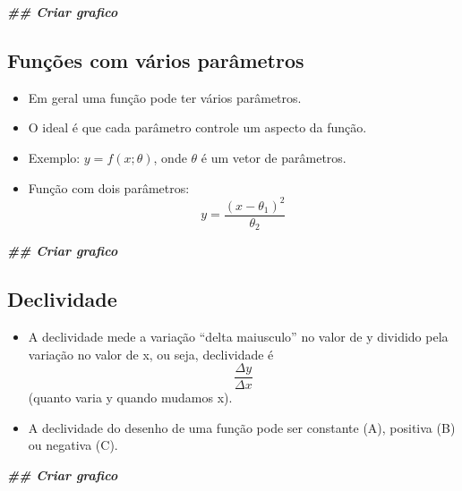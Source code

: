 \documentclass[
]{article}
\newenvironment{Shaded}{\begin{snugshade}}{\end{snugshade}}
\newcommand{\DocumentationTok}[1]{\textcolor[rgb]{0.56,0.35,0.01}{\textbf{\textit{#1}}}}
\providecommand{\tightlist}{%
  \setlength{\itemsep}{0pt}\setlength{\parskip}{0pt}}
\begin{document}
\begin{Shaded}
\begin{Highlighting}[]
\DocumentationTok{\#\# Criar grafico}
\end{Highlighting}
\end{Shaded}

\hypertarget{funuxe7uxf5es-com-vuxe1rios-paruxe2metros}{%
\subsection{Funções com vários
parâmetros}\label{funuxe7uxf5es-com-vuxe1rios-paruxe2metros}}

\begin{itemize}
\tightlist
\item
  Em geral uma função pode ter vários parâmetros.
\item
  O ideal é que cada parâmetro controle um aspecto da função.
\item
  Exemplo: \(y = f(x; \theta)\), onde \(\theta\) é um vetor de
  parâmetros.
\item
  Função com dois parâmetros:
  \[ y = \frac{(x - \theta_{1})^2}{\theta_{2}}\]
\end{itemize}

\begin{Shaded}
\begin{Highlighting}[]
\DocumentationTok{\#\# Criar grafico}
\end{Highlighting}
\end{Shaded}

\hypertarget{declividade}{%
\subsection{Declividade}\label{declividade}}

\begin{itemize}
\tightlist
\item
  A declividade mede a variação ``delta maiusculo'' no valor de y
  dividido pela variação no valor de x, ou seja, declividade é
  \[ \frac{\Delta y}{\Delta x}\] (quanto varia y quando mudamos x).
\item
  A declividade do desenho de uma função pode ser constante (A),
  positiva (B) ou negativa (C).
\end{itemize}

\begin{Shaded}
\begin{Highlighting}[]
\DocumentationTok{\#\# Criar grafico}
\end{Highlighting}
\end{Shaded}
\end{document}
